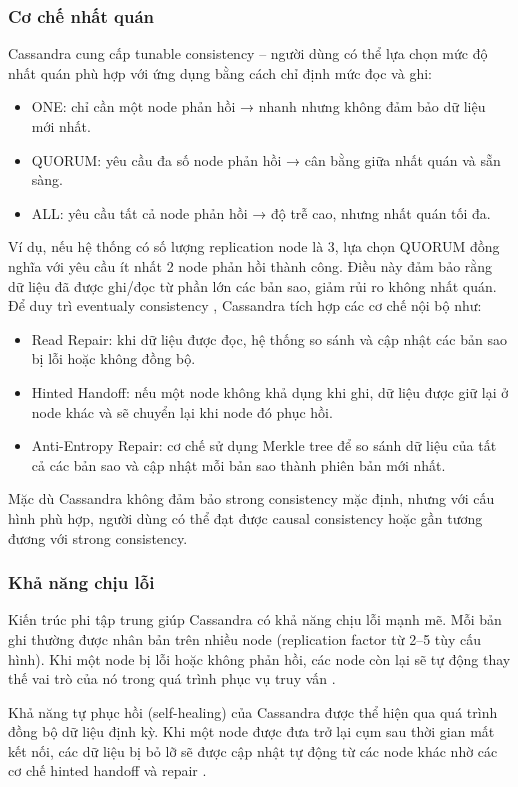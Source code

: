 \documentclass[conference]{IEEEtran}
\begin{document}
\subsubsection{Cơ chế nhất quán}
Cassandra cung cấp tunable consistency – người dùng có thể lựa chọn mức độ nhất quán phù hợp với ứng dụng bằng cách chỉ định mức đọc và ghi:
\begin{itemize}
    \item ONE: chỉ cần một node phản hồi → nhanh nhưng không đảm bảo dữ liệu mới nhất.
    \item QUORUM: yêu cầu đa số node phản hồi → cân bằng giữa nhất quán và sẵn sàng.
    \item ALL: yêu cầu tất cả node phản hồi → độ trễ cao, nhưng nhất quán tối đa.\cite{cassandrafb}
\end{itemize}
Ví dụ, nếu hệ thống có số lượng replication node là 3, lựa chọn QUORUM đồng nghĩa với yêu cầu ít nhất 2 node phản hồi thành công. Điều này đảm bảo rằng dữ liệu đã được ghi/đọc từ phần lớn các bản sao, giảm rủi ro không nhất quán.\\
Để duy trì eventualy consistency , Cassandra tích hợp các cơ chế nội bộ như:
\begin{itemize}
    \item Read Repair: khi dữ liệu được đọc, hệ thống so sánh và cập nhật các bản sao bị lỗi hoặc không đồng bộ.
    \item Hinted Handoff: nếu một node không khả dụng khi ghi, dữ liệu được giữ lại ở node khác và sẽ chuyển lại khi node đó phục hồi.
    \item Anti-Entropy Repair: cơ chế sử dụng Merkle tree để so sánh dữ liệu của tất cả các bản sao và cập nhật mỗi bản sao thành phiên bản mới nhất.\cite{cassandradocs}
\end{itemize}
Mặc dù Cassandra không đảm bảo strong consistency mặc định, nhưng với cấu hình phù hợp, người dùng có thể đạt được causal consistency hoặc gần tương đương với strong consistency.
\subsubsection{Khả năng chịu lỗi}
Kiến trúc phi tập trung giúp Cassandra có khả năng chịu lỗi mạnh mẽ. Mỗi bản ghi thường được nhân bản trên nhiều node (replication factor từ 2–5 tùy cấu hình). Khi một node bị lỗi hoặc không phản hồi, các node còn lại sẽ tự động thay thế vai trò của nó trong quá trình phục vụ truy vấn \cite{cassandradocs}.

Khả năng tự phục hồi (self-healing) của Cassandra được thể hiện qua quá trình đồng bộ dữ liệu định kỳ. Khi một node được đưa trở lại cụm sau thời gian mất kết nối, các dữ liệu bị bỏ lỡ sẽ được cập nhật tự động từ các node khác nhờ các cơ chế hinted handoff và repair \cite{cassandradocs}.
\end{document}
